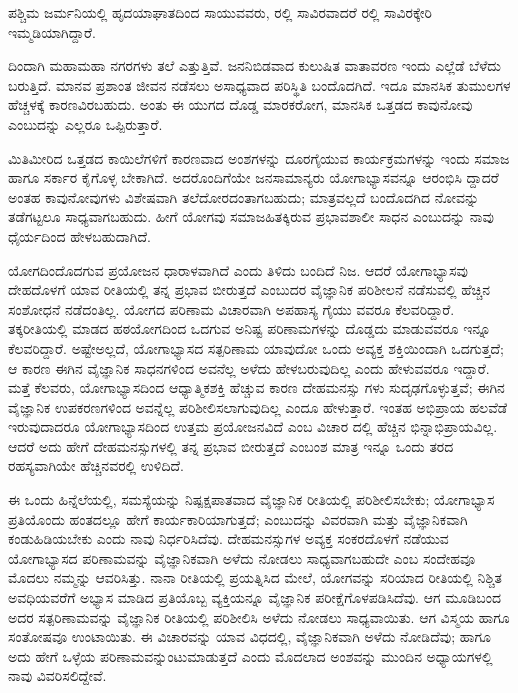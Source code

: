 ಪಶ್ಚಿಮ ಜರ್ಮನಿಯಲ್ಲಿ ಹೃದಯಾಘಾತದಿಂದ ಸಾಯುವವರು,  ರಲ್ಲಿ  ಸಾವಿರವಾದರೆ  ರಲ್ಲಿ  ಸಾವಿರಕ್ಕೇರಿ ಇಮ್ಮಡಿಯಾಗಿದ್ದಾರೆ.

ದಿಂದಾಗಿ ಮಹಾಮಹಾ ನಗರಗಳು ತಲೆ ಎತ್ತುತ್ತಿವೆ. ಜನನಿಬಿಡವಾದ ಕುಲುಷಿತ ವಾತಾವರಣ ಇಂದು ಎಲ್ಲೆಡೆ ಬೆಳೆದು ಬರುತ್ತಿದೆ. ಮಾನವ ಪ್ರಶಾಂತ ಜೀವನ ನಡೆಸಲು ಅಸಾಧ್ಯವಾದ ಪರಿಸ್ಥಿತಿ ಬಂದೊದಗಿದೆ. ಇದೂ ಮಾನಸಿಕ ತುಮುಲಗಳ ಹೆಚ್ಚಳಕ್ಕೆ ಕಾರಣವಿರಬಹುದು. ಅಂತು ಈ ಯುಗದ ದೊಡ್ಡ ಮಾರಕರೋಗ, ಮಾನಸಿಕ ಒತ್ತಡದ ಕಾವುನೋವು ಎಂಬುದನ್ನು ಎಲ್ಲರೂ ಒಪ್ಪಿರುತ್ತಾರೆ.

ಮಿತಿಮೀರಿದ ಒತ್ತಡದ ಕಾಯಿಲೆಗಳಿಗೆ ಕಾರಣವಾದ ಅಂಶಗಳನ್ನು ದೂರಗೈಯುವ ಕಾರ್ಯಕ್ರಮಗಳನ್ನು ಇಂದು ಸಮಾಜ ಹಾಗೂ ಸರ್ಕಾರ ಕೈಗೊಳ್ಳ ಬೇಕಾಗಿದೆ. ಅದರೊಂದಿಗೆಯೇ ಜನಸಾಮಾನ್ಯರು ಯೋಗಾಭ್ಯಾಸವನ್ನೂ ಆರಂಭಿಸಿ ದ್ದಾದರೆ ಅಂತಹ ಕಾವುನೋವುಗಳು ವಿಶೇಷವಾಗಿ ತಲೆದೋರದಂತಾಗಬಹುದು; ಮಾತ್ರವಲ್ಲದೆ ಬಂದೊದಗಿದ ನೋವನ್ನು ತಡೆಗಟ್ಟಲೂ ಸಾಧ್ಯವಾಗಬಹುದು. ಹೀಗೆ ಯೋಗವು ಸಮಾಜಹಿತಕ್ಕಿರುವ ಪ್ರಭಾವಶಾಲೀ ಸಾಧನ ಎಂಬುದನ್ನು ನಾವು ಧೈರ್ಯದಿಂದ ಹೇಳಬಹುದಾಗಿದೆ.

ಯೋಗದಿಂದೊದಗುವ ಪ್ರಯೋಜನ ಧಾರಾಳವಾಗಿದೆ ಎಂದು ತಿಳಿದು ಬಂದಿದೆ ನಿಜ. ಆದರೆ ಯೋಗಾಭ್ಯಾಸವು ದೇಹದೊಳಗೆ ಯಾವ ರೀತಿಯಲ್ಲಿ ತನ್ನ ಪ್ರಭಾವ ಬೀರುತ್ತದೆ ಎಂಬುದರ ವೈಜ್ಞಾನಿಕ ಪರಿಶೀಲನೆ ನಡೆಸುವಲ್ಲಿ ಹೆಚ್ಚಿನ ಸಂಶೋಧನೆ ನಡೆದಂತಿಲ್ಲ. ಯೋಗದ ಪರಿಣಾಮ ವಿಚಾರವಾಗಿ ಅಪಹಾಸ್ಯ ಗೈಯು ವವರೂ ಕೆಲವರಿದ್ದಾರೆ. ತಕ್ಕರೀತಿಯಲ್ಲಿ ಮಾಡದ ಹಠಯೋಗದಿಂದ ಒದಗುವ ಅನಿಷ್ಟ ಪರಿಣಾಮಗಳನ್ನು ದೊಡ್ಡದು ಮಾಡುವವರೂ ಇನ್ನೂ ಕೆಲವರಿದ್ದಾರೆ. ಅಷ್ಟೇಅಲ್ಲದೆ, ಯೋಗಾಭ್ಯಾಸದ ಸತ್ಪರಿಣಾಮ ಯಾವುದೋ ಒಂದು ಅವ್ಯಕ್ತ ಶಕ್ತಿಯಿಂದಾಗಿ ಒದಗುತ್ತದೆ; ಆ ಕಾರಣ ಈಗಿನ ವೈಜ್ಞಾನಿಕ ಸಾಧನಗಳಿಂದ ಅವನೆಲ್ಲ ಅಳೆದು ಹೇಳಬರುವುದಿಲ್ಲ ಎಂದು ಹೇಳುವವರೂ ಇದ್ದಾರೆ. ಮತ್ತೆ ಕೆಲವರು, ಯೋಗಾಭ್ಯಾಸದಿಂದ ಆಧ್ಯಾತ್ಮಿಕಶಕ್ತಿ ಹೆಚ್ಚುವ ಕಾರಣ ದೇಹಮನಸ್ಸು ಗಳು ಸುದೃಢಗೊಳ್ಳುತ್ತವೆ; ಈಗಿನ ವೈಜ್ಞಾನಿಕ ಉಪಕರಣಗಳಿಂದ ಅವನ್ನೆಲ್ಲ ಪರಿಶೀಲಿಸಲಾಗುವುದಿಲ್ಲ ಎಂದೂ ಹೇಳುತ್ತಾರೆ. ಇಂತಹ ಅಭಿಪ್ರಾಯ ಹಲವೆಡೆ ಇರುವುದಾದರೂ ಯೋಗಾಭ್ಯಾಸದಿಂದ ಉತ್ತಮ ಪ್ರಯೋಜನವಿದೆ ಎಂಬ ವಿಚಾರ ದಲ್ಲಿ ಹೆಚ್ಚಿನ ಭಿನ್ನಾಭಿಪ್ರಾಯವಿಲ್ಲ. ಆದರೆ ಅದು ಹೇಗೆ ದೇಹಮನಸ್ಸುಗಳಲ್ಲಿ ತನ್ನ ಪ್ರಭಾವ ಬೀರುತ್ತದೆ ಎಂಬಂಶ ಮಾತ್ರ ಇನ್ನೂ ಒಂದು ತರದ ರಹಸ್ಯವಾಗಿಯೇ ಹೆಚ್ಚಿನವರಲ್ಲಿ ಉಳಿದಿದೆ.

ಈ ಒಂದು ಹಿನ್ನೆಲೆಯಲ್ಲಿ, ಸಮಸ್ಯೆಯನ್ನು ನಿಷ್ಪಕ್ಷಪಾತವಾದ ವೈಜ್ಞಾನಿಕ ರೀತಿಯಲ್ಲಿ ಪರಿಶೀಲಿಸಬೇಕು; ಯೋಗಾಭ್ಯಾಸ ಪ್ರತಿಯೊಂದು ಹಂತದಲ್ಲೂ ಹೇಗೆ ಕಾರ್ಯಕಾರಿಯಾಗುತ್ತದೆ; ಎಂಬುದನ್ನು ವಿವರವಾಗಿ ಮತ್ತು ವೈಜ್ಞಾನಿಕವಾಗಿ ಕಂಡುಹಿಡಿಯಬೇಕು ಎಂದು ನಾವು ನಿರ್ಧರಿಸಿದೆವು. ದೇಹಮನಸ್ಸುಗಳ ಅವ್ಯಕ್ತ ಸಂಕರದೊಳಗೆ ನಡೆಯುವ ಯೋಗಾಭ್ಯಾಸದ ಪರಿಣಾಮವನ್ನು ವೈಜ್ಞಾನಿಕವಾಗಿ ಅಳೆದು ನೋಡಲು ಸಾಧ್ಯವಾಗಬಹುದೇ ಎಂಬ ಸಂದೇಹವೂ ಮೊದಲು ನಮ್ಮನ್ನು ಆವರಿಸಿತ್ತು. ನಾನಾ ರೀತಿಯಲ್ಲಿ ಪ್ರಯತ್ನಿಸಿದ ಮೇಲೆ, ಯೋಗವನ್ನು ಸರಿಯಾದ ರೀತಿಯಲ್ಲಿ ನಿಶ್ಚಿತ ಅವಧಿಯವರೆಗೆ ಅಭ್ಯಾಸ ಮಾಡಿದ ಪ್ರತಿಯೊಬ್ಬ ವ್ಯಕ್ತಿಯನ್ನೂ ವೈಜ್ಞಾನಿಕ ಪರೀಕ್ಷೆಗೊಳಪಡಿಸಿದೆವು. ಆಗ ಮೂಡಿಬಂದ ಅದರ ಸತ್ಪರಿಣಾಮವನ್ನು ವೈಜ್ಞಾನಿಕ ರೀತಿಯಲ್ಲಿ ಪರಿಶೀಲಿಸಿ ಅಳೆದು ನೋಡಲು ಸಾಧ್ಯವಾಯಿತು. ಆಗ ವಿಸ್ಮಯ ಹಾಗೂ ಸಂತೋಷವೂ ಉಂಟಾಯಿತು. ಈ ವಿಚಾರವನ್ನು ಯಾವ ವಿಧದಲ್ಲಿ, ವೈಜ್ಞಾನಿಕವಾಗಿ ಅಳೆದು ನೋಡಿದೆವು; ಹಾಗೂ ಅದು ಹೇಗೆ ಒಳ್ಳೆಯ ಪರಿಣಾಮವನ್ನುಂಟುಮಾಡುತ್ತದೆ ಎಂದು ಮೊದಲಾದ ಅಂಶವನ್ನು ಮುಂದಿನ ಅಧ್ಯಾಯಗಳಲ್ಲಿ ನಾವು ವಿವರಿಸಲಿದ್ದೇವೆ.

